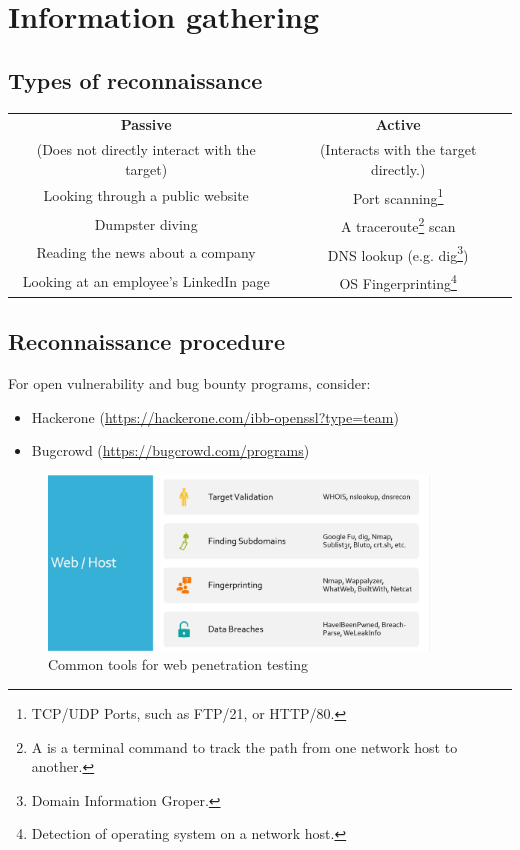 \documentclass[a4paper,11pt]{article}
\renewcommand{\tt}[2][tt]{\textcolor{#1}{\ttfamily #2}}%
\begin{document}
\section{Information gathering}

\subsection{Types of reconnaissance}

\begin{longtable}{c|c}
    \bf{Passive} & \bf{Active}
    \\
    \small{(Does not directly interact with the target)} & \small{(Interacts with the target directly.)}
    \\
    \bottomrule
    Looking through a public website & Port scanning\footnote[2]{TCP/UDP Ports, such as FTP/21, or HTTP/80.}
    \\
    Dumpster diving & A \tt{traceroute}\footnote[1]{A is a terminal command to track the path from one network host to another.} scan
    \\
    Reading the news about a company & DNS lookup (e.g. \tt{dig}\footnote[3]{Domain Information Groper.})
    \\
    Looking at an employee's LinkedIn page & OS Fingerprinting\footnote[4]{Detection of operating system on a network host.}
\end{longtable}

\subsection{Reconnaissance procedure}

For open vulnerability and bug bounty programs, consider:
\begin{itemize}
    \item Hackerone (\url{https://hackerone.com/ibb-openssl?type=team})
    \item Bugcrowd (\url{https://bugcrowd.com/programs})
\end{itemize}
\begin{figure}[h]
    \centering
    \includegraphics[width=0.9\textwidth]{images/webprocess.png}
    \caption{Common tools for web penetration testing}
    \label{fig:webprocess}
\end{figure}
\end{document}
